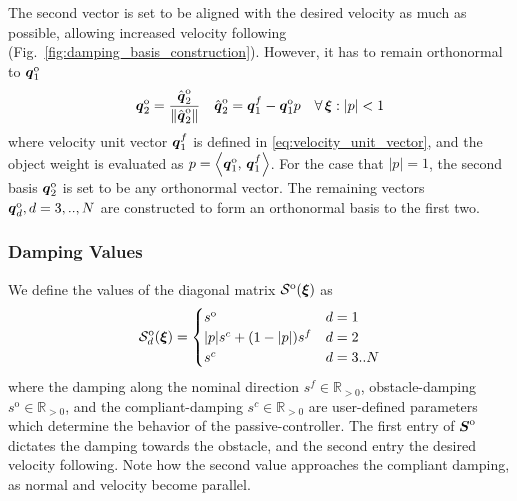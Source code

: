 The second vector is set to be aligned with the desired velocity as much as possible, allowing increased velocity following (Fig.~\ref{fig:damping_basis_construction}). However, it has to remain orthonormal to $\boldsymbol{q}_1^{\mathrm{o}}$
\begin{equation}
  \boldsymbol{q}_2^{\mathrm{o}} = \frac{\hat{\boldsymbol{q}}_2^{\mathrm{o}}}{\| \hat{\boldsymbol{q}}_2^{\mathrm{o}} \|}
  \quad
  \hat{\boldsymbol{q}}_2^{\mathrm{o}} = \boldsymbol{q}_1^{f} - \boldsymbol{q}_1^{\mathrm{o}} p \quad  \forall \, \boldsymbol{\xi} : | p | < 1
\end{equation}
where velocity unit vector $\boldsymbol{q}_1^{f}$ is defined in \eqref{eq:velocity_unit_vector}, and the object weight is evaluated as $p = \left\langle {\boldsymbol{q}_1^{\mathrm{o}}}, \, {\boldsymbol{q}_1^{f}} \right\rangle$. 
For the case that $| p | = 1$, the second basis $\boldsymbol{q}_2^{\mathrm{o}}$ is set to be any orthonormal vector. The remaining vectors $\boldsymbol{q}_d^{\mathrm{o}}, d = 3, .., N$ are constructed to form an orthonormal basis to the first two.

\subsubsection{Damping Values}
We define the values of the diagonal matrix $\mathcal{S}^{\mathrm{o}}(\boldsymbol{\xi})$ as\begin{equation}
  \matd{S}_d^{\mathrm{o}}(\vecs \xi) =
  \begin{cases}
    s^{\mathrm{o}} & d = 1 \\
    | p | s^c + (1 - | p |) s^{f} & d = 2 \\
    s^c & d = 3 .. N
  \end{cases}
  \label{eq:obstacle_damping_values}
\end{equation}
where the damping along the nominal direction $s^{f} \in \mathbb{R}_{>0}$, obstacle-damping $s^{\mathrm{o}} \in \mathbb{R}_{>0}$, and the compliant-damping $s^c \in \mathbb{R}_{>0}$ are user-defined parameters which determine the behavior of the passive-controller. The first entry of $\boldsymbol{S}^{\mathrm{o}}$ dictates the damping towards the obstacle, and the second entry the desired velocity following. Note how the second value approaches the compliant damping, as normal and velocity become parallel.


